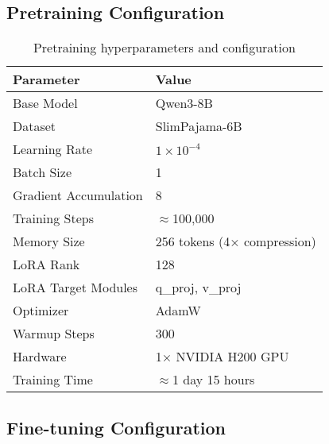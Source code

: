 \subsection{Pretraining Configuration}

\begin{table}[h]
    \centering
    \small
    \begin{tabular}{ll}
        \toprule
        \textbf{Parameter} & \textbf{Value} \\
        \midrule
        Base Model & Qwen3-8B \\
        Dataset & SlimPajama-6B \\
        Learning Rate & $1 \times 10^{-4}$ \\
        Batch Size & 1 \\
        Gradient Accumulation & 8 \\
        Training Steps & $\approx$100,000 \\
        Memory Size & 256 tokens (4× compression) \\
        LoRA Rank & 128 \\
        LoRA Target Modules & q\_proj, v\_proj \\
        Optimizer & AdamW \\
        Warmup Steps & 300 \\
        Hardware & 1× NVIDIA H200 GPU \\
        Training Time & $\approx$1 day 15 hours \\
        \bottomrule
    \end{tabular}
    \caption{Pretraining hyperparameters and configuration}
    \label{tab:pretrain_config}
\end{table}

\subsection{Fine-tuning Configuration}

